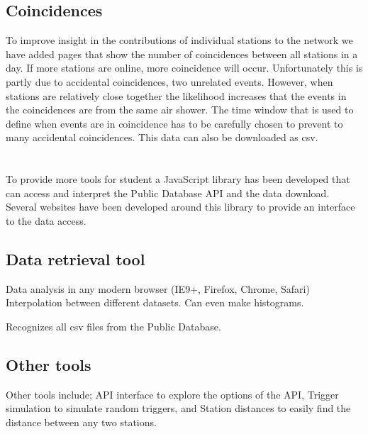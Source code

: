 \subsection{Coincidences}

To improve insight in the contributions of individual stations to the
\hisparc network we have added pages that show the number of
coincidences between all \hisparc stations in a day. If more stations
are online, more coincidence will occur. Unfortunately this is partly
due to accidental coincidences, two unrelated events. However, when
stations are relatively close together the likelihood increases that the
events in the coincidences are from the same air shower. The time window
that is used to define when events are in coincidence has to be
carefully chosen to prevent to many accidental coincidences. This data
can also be downloaded as csv.


\section{\jsparc}

To provide more tools for student a JavaScript library has been
developed that can access and interpret the Public Database API and the
data download. Several websites have been developed around this library
to provide an interface to the data access.


\subsection{Data retrieval tool}

Data analysis in any modern browser (IE9+, Firefox, Chrome, Safari)
Interpolation between different datasets. Can even make histograms.

Recognizes all csv files from the Public Database.


\subsection{Other tools}

Other tools include; API interface to explore the options of the API,
Trigger simulation to simulate random triggers, and Station distances to
easily find the distance between any two stations.

